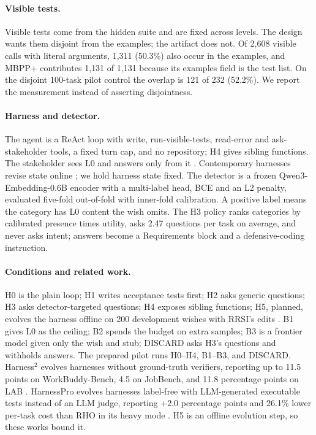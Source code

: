 \documentclass{article}
\begin{document}
\paragraph{Visible tests.}
Visible tests come from the hidden suite and are fixed across levels. The design wants them
disjoint from the examples; the artifact does not. Of 2{,}608 visible calls with
literal arguments, 1{,}311 (50.3\%) also occur in the examples, and MBPP+ contributes 1{,}131 of
1{,}131 because its examples field is the test list. On the disjoint 100-task pilot control the
overlap is 121 of 232 (52.2\%). We report the measurement instead of asserting disjointness.

\paragraph{Harness and detector.}
The agent is a ReAct loop with write, run-visible-tests, read-error and ask-stakeholder tools, a
fixed turn cap, and no repository; H4 gives sibling functions. The stakeholder sees L0 and
answers only from it \citep{mu2023clarifygpt}. Contemporary harnesses revise state
online \citep{xiao2026reharness}; we hold harness state fixed. The detector is a frozen
Qwen3-Embedding-0.6B encoder with a multi-label head, BCE and an L2 penalty, evaluated five-fold
out-of-fold with inner-fold calibration. A positive label means the category has
L0 content the wish omits. The H3 policy ranks categories by calibrated presence times utility, asks
2.47 questions per task on average, and never asks intent; answers become a Requirements block
and a defensive-coding instruction.

\paragraph{Conditions and related work.}
H0 is the plain loop; H1 writes acceptance tests first; H2 asks generic questions; H3 asks
detector-targeted questions; H4 exposes sibling functions; H5, planned, evolves the harness
offline on 200 development wishes with RRSI's edits \citep{xia2026rrsi}. B1 gives L0 as the
ceiling; B2 spends the budget on extra samples; B3 is a frontier model given only the wish and stub;
DISCARD asks H3's questions and withholds answers. The prepared pilot runs H0--H4, B1--B3, and
DISCARD. Harness$^2$ evolves harnesses without ground-truth verifiers, reporting up to 11.5
points on WorkBuddy-Bench, 4.5 on JobBench, and 11.8 percentage points on LAB
\citep{xu2026harness2}. HarnessPro evolves harnesses label-free with LLM-generated executable
tests instead of an LLM judge, reporting +2.0 percentage points and 26.1\% lower per-task cost
than RHO in its heavy mode \citep{pan2026harnesspro}. H5 is an offline evolution step, so these works bound it.
\end{document}
